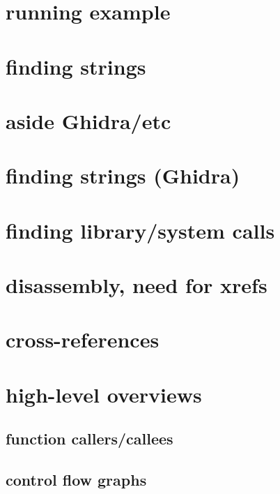 \section{running example}


\section{finding strings}


\section{aside Ghidra/etc}


\section{finding strings (Ghidra)}


\section{finding library/system calls}




\section{disassembly, need for xrefs}


\section{cross-references}


\section{high-level overviews}

\subsection{function callers/callees}

\subsection{control flow graphs}


